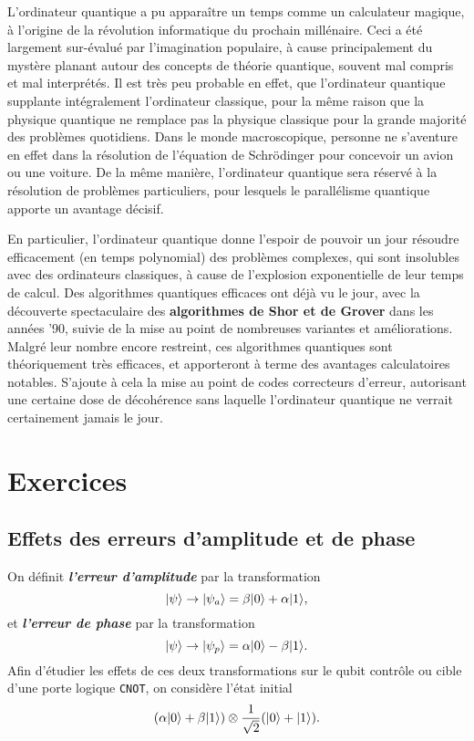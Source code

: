 L'ordinateur quantique a pu apparaître un temps comme un calculateur magique,
à l'origine de la révolution informatique du prochain millénaire. Ceci a été
largement sur-évalué par l'imagination populaire, à cause principalement du
mystère planant autour des concepts de théorie quantique, souvent mal compris
et mal interprétés. Il est très peu probable en effet, que l'ordinateur
quantique supplante intégralement l'ordinateur classique, pour la même raison
que la physique quantique ne remplace pas la physique classique pour la grande
majorité des problèmes quotidiens. Dans le monde macroscopique, personne ne
s'aventure en effet dans la résolution de l'équation de Schrödinger pour
concevoir un avion ou une voiture. De la même manière, l'ordinateur quantique
sera réservé à la résolution de problèmes particuliers, pour lesquels le
parallélisme quantique apporte un avantage décisif.

En particulier, l'ordinateur quantique donne l'espoir de pouvoir un jour
résoudre efficacement (en temps polynomial) des problèmes complexes, qui sont
insolubles avec des ordinateurs classiques, à cause de l'explosion exponentielle
de leur temps de calcul. Des algorithmes quantiques efficaces ont déjà vu le
jour, avec la découverte spectaculaire des \textbf{algorithmes de Shor et de
Grover} dans les années '90, suivie de la mise au point de nombreuses variantes
et améliorations. Malgré leur nombre encore restreint, ces algorithmes
quantiques sont théoriquement très efficaces, et apporteront à terme des
avantages calculatoires notables. S'ajoute à cela la mise au point de codes
correcteurs d'erreur, autorisant une certaine dose de décohérence sans laquelle
l'ordinateur quantique ne verrait certainement jamais le jour.

\newpage
\section{Exercices}


\subsection{Effets des erreurs d'amplitude et de phase}

On définit \emph{\textbf{l'erreur d'amplitude}} par la transformation%
\begin{equation}
\vert\psi\rangle\rightarrow\vert\psi_{a}\rangle=\beta\vert0\rangle +\alpha\vert1\rangle ,
\end{equation}
et \emph{\textbf{l'erreur de phase}} par la transformation%
\begin{equation}
\vert\psi\rangle\rightarrow\vert\psi_{p}\rangle=\alpha\vert0\rangle -\beta\vert1\rangle .
\end{equation}
Afin d'étudier les effets de ces deux transformations sur le qubit contrôle ou
cible d'une porte logique \texttt{CNOT}, on considère l'état initial%
\begin{equation}
(\alpha\vert0\rangle +\beta\vert1\rangle)\otimes\frac{1}{\sqrt{2}}(\vert0\rangle+\vert1\rangle).
\end{equation}

